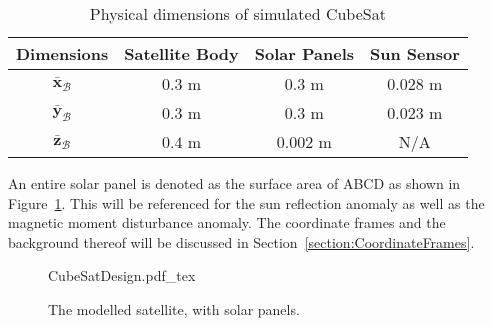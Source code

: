 \begin{table}[h!t!b]
	\centering
	\caption{\label{Table:Dimensions}Physical dimensions of simulated CubeSat}
	\begin{tabular}{c c c c}
		\hline\hline
		Dimensions & Satellite Body & Solar Panels & Sun Sensor \\ \hline
		$\bar{\mathbf{x}}_\mathcal{B}$          & $0.3$ m                    & $0.3$ m                       & $0.028$ m                   \\
		$\bar{\mathbf{y}}_\mathcal{B}$          & $0.3$ m                    & $0.3$ m                       & $0.023$ m                   \\
		$\bar{\mathbf{z}}_\mathcal{B}$          & $0.4$ m                    & $0.002$ m                     & N/A                     \\
		\hline\hline
	\end{tabular}
\end{table}

An entire solar panel is denoted as the surface area of ABCD as shown in Figure~\ref{fig:CubeSatDesign}. This will be referenced for the sun reflection anomaly as well as the magnetic moment disturbance anomaly. The coordinate frames and the background thereof will be discussed in Section~\ref{section:CoordinateFrames}.

\begin{figure}[h!t!b]
	\centering
	\def\svgwidth{14cm}
	{CubeSatDesign.pdf_tex}
	\caption{The modelled satellite, with solar panels.}
	\label{fig:CubeSatDesign}
\end{figure}


